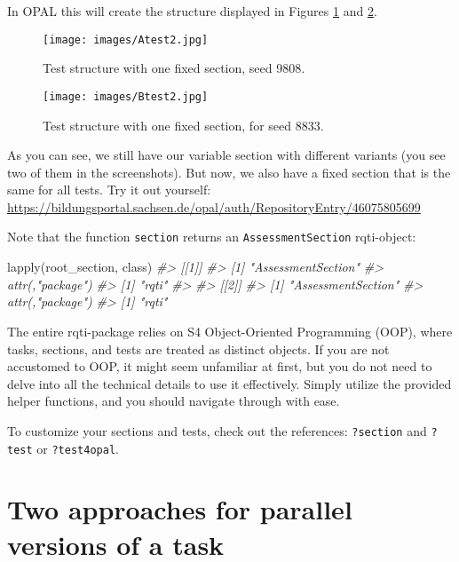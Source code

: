 \documentclass[twoside]{tufte-book}
\newenvironment{Shaded}{}{}
\newcommand{\CommentTok}[1]{\textcolor[rgb]{0.38,0.63,0.69}{\textit{#1}}}
\newcommand{\FunctionTok}[1]{\textcolor[rgb]{0.02,0.16,0.49}{#1}}
\newcommand{\NormalTok}[1]{#1}
\begin{document}
In OPAL this will create the structure displayed in Figures \ref{a2} and \ref{b2}.

\begin{figure}
\centering
\texttt{[image: images/Atest2.jpg]}
\caption{\label{a2}Test structure with one fixed section, seed 9808.}
\end{figure}

\begin{figure}
\centering
\texttt{[image: images/Btest2.jpg]}
\caption{\label{b2}Test structure with one fixed section, for seed 8833.}
\end{figure}

As you can see, we still have our variable section with different variants (you see two of them in the screenshots). But now, we also have a fixed section that is the same for all tests. Try it out yourself: \url{https://bildungsportal.sachsen.de/opal/auth/RepositoryEntry/46075805699}

Note that the function \texttt{section} returns an \texttt{AssessmentSection} rqti-object:

\begin{Shaded}
\begin{Highlighting}[]
\FunctionTok{lapply}\NormalTok{(root\_section, class)}
\CommentTok{\#\textgreater{} [[1]]}
\CommentTok{\#\textgreater{} [1] "AssessmentSection"}
\CommentTok{\#\textgreater{} attr(,"package")}
\CommentTok{\#\textgreater{} [1] "rqti"}
\CommentTok{\#\textgreater{} }
\CommentTok{\#\textgreater{} [[2]]}
\CommentTok{\#\textgreater{} [1] "AssessmentSection"}
\CommentTok{\#\textgreater{} attr(,"package")}
\CommentTok{\#\textgreater{} [1] "rqti"}
\end{Highlighting}
\end{Shaded}

The entire rqti-package relies on S4 Object-Oriented Programming (OOP), where tasks, sections, and tests are treated as distinct objects. If you are not accustomed to OOP, it might seem unfamiliar at first, but you do not need to delve into all the technical details to use it effectively. Simply utilize the provided helper functions, and you should navigate through with ease.

To customize your sections and tests, check out the references: \texttt{?section} and \texttt{?test} or \texttt{?test4opal}.

\section{Two approaches for parallel versions of a task}\label{two-approaches-for-parallel-versions-of-a-task}
\end{document}
